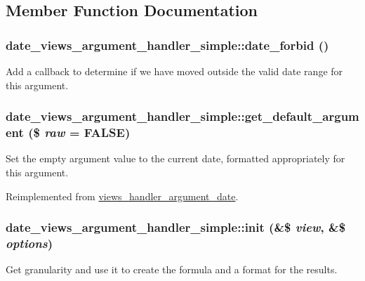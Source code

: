 \subsection{Member Function Documentation}
\hypertarget{classdate__views__argument__handler__simple_a76b7453056c55eb7b0947dbd7fb37526}{
\subsubsection[{date\_\-forbid}]{\setlength{\rightskip}{0pt plus 5cm}date\_\-views\_\-argument\_\-handler\_\-simple::date\_\-forbid ()}}
\label{classdate__views__argument__handler__simple_a76b7453056c55eb7b0947dbd7fb37526}
Add a callback to determine if we have moved outside the valid date range for this argument. \hypertarget{classdate__views__argument__handler__simple_ad4843a30369e2de82db47c204167cbb0}{
\subsubsection[{get\_\-default\_\-argument}]{\setlength{\rightskip}{0pt plus 5cm}date\_\-views\_\-argument\_\-handler\_\-simple::get\_\-default\_\-argument (\$ {\em raw} = {\ttfamily FALSE})}}
\label{classdate__views__argument__handler__simple_ad4843a30369e2de82db47c204167cbb0}
Set the empty argument value to the current date, formatted appropriately for this argument. 

Reimplemented from \hyperlink{classviews__handler__argument__date_a1e5320e475b9e86ed9acc59c9a525610}{views\_\-handler\_\-argument\_\-date}.\hypertarget{classdate__views__argument__handler__simple_afa0fa54cf00568c919af125b94c01ede}{
\subsubsection[{init}]{\setlength{\rightskip}{0pt plus 5cm}date\_\-views\_\-argument\_\-handler\_\-simple::init (\&\$ {\em view}, \/  \&\$ {\em options})}}
\label{classdate__views__argument__handler__simple_afa0fa54cf00568c919af125b94c01ede}
Get granularity and use it to create the formula and a format for the results. 

